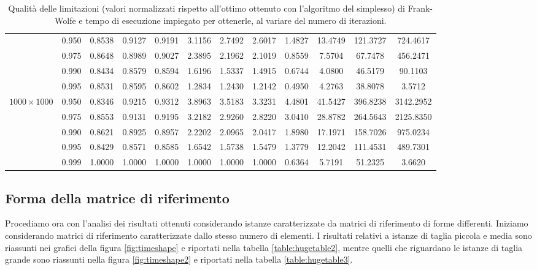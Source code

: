 \begin{landscape}
\begin{table}[!h]
\begin{tabularx}{665.19638pt}{cccccccccccc}
        & 0.950 & 0.8538 & 0.9127 & 0.9191 & 3.1156 & 2.7492 & 2.6017 & 1.4827 & 13.4749 & 121.3727 & 724.4617 \\
        & 0.975 & 0.8648 & 0.8989 & 0.9027 & 2.3895 & 2.1962 & 2.1019 & 0.8559 & 7.5704 & 67.7478 & 456.2471 \\
        & 0.990 & 0.8434 & 0.8579 & 0.8594 & 1.6196 & 1.5337 & 1.4915 & 0.6744 & 4.0800 & 46.5179 & 90.1103 \\
        & 0.995 & 0.8531 & 0.8595 & 0.8602 & 1.2834 & 1.2430 & 1.2142 & 0.4950 & 4.2763 & 38.8078 & 3.5712 \\
        \midrule
        \( 1000\times 1000 \)
        & 0.950 & 0.8346 & 0.9215 & 0.9312 & 3.8963 & 3.5183 & 3.3231 & 4.4801 & 41.5427 & 396.8238 & 3142.2952 \\
        & 0.975 & 0.8553 & 0.9131 & 0.9195 & 3.2182 & 2.9260 & 2.8220 & 3.0410 & 28.8782 & 264.5643 & 2125.8350 \\
        & 0.990 & 0.8621 & 0.8925 & 0.8957 & 2.2202 & 2.0965 & 2.0417 & 1.8980 & 17.1971 & 158.7026 & 975.0234 \\
        & 0.995 & 0.8429 & 0.8571 & 0.8585 & 1.6542 & 1.5738 & 1.5479 & 1.3779 & 12.2042 & 111.4531 & 489.7301 \\
        & 0.999 & 1.0000 & 1.0000 & 1.0000 & 1.0000 & 1.0000 & 1.0000 & 0.6364 & 5.7191 & 51.2325 & 3.6620 \\
        \bottomrule
    \end{tabularx}
    \caption{Qualità delle limitazioni (valori normalizzati rispetto all'ottimo ottenuto con l'algoritmo del simplesso)
    di Frank-Wolfe e tempo di esecuzione impiegato per ottenerle, al variare del numero di iterazioni.}
    \label{table:timesize1}
\end{table}
\end{landscape}

\subsection{Forma della matrice di riferimento}

Procediamo ora con l'analisi dei risultati ottenuti considerando istanze caratterizzate da matrici di riferimento di
forme differenti. Iniziamo considerando matrici di riferimento caratterizzate dallo stesso numero di elementi. I
risultati relativi a istanze di taglia piccola e media sono riassunti nei grafici della figura \ref{fig:timeshape} e
riportati nella tabella \ref{table:hugetable2}, mentre quelli che riguardano le istanze di taglia grande sono riassunti
nella figura \ref{fig:timeshape2} e riportati nella tabella \ref{table:hugetable3}.

